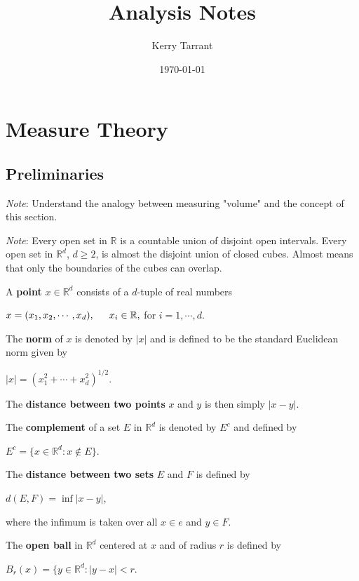 \documentclass{book}
\title{Analysis Notes}
\author{Kerry Tarrant}
\date\today
\newcommand{\RR}{\mathbb R}
\begin{document}
\maketitle
\tableofcontents{}


\chapter{Measure Theory}

\section{Preliminaries}
\textit{Note}: Understand the analogy between measuring "volume" and the concept of this section.

\textit{Note}: Every open set in $\mathbb{R}$ is a countable union of disjoint open intervals. Every open set in $\mathbb{R}^{d}$, $d\geq 2$, is almost the disjoint union of closed cubes. Almost means that only the boundaries of the cubes can overlap.


A \textbf{point} $x\in \RR^{d}$ consists of a $d$-tuple of real numbers
\begin{center}
$x=(x_1,x_2,\cdots,x_d), \hspace*{15pt} x_i\in \RR,$ for $i=1,\cdots,d$.
\end{center}

The \textbf{norm} of $x$ is denoted by $|x|$ and is defined to be the standard Euclidean norm given by
\begin{center}
    $|x|=(x_1^2+\cdots+x_d^2)^{1/2}$.
\end{center}

The \textbf{distance between two points} $x$ and $y$ is then simply $|x-y|$.

The \textbf{complement} of a set $E$ in $\RR^d$ is denoted by $E^c$ and defined by
\begin{center}
    $E^c=\{x\in\RR^d:x\notin E\}$.
\end{center}

The \textbf{distance between two sets} $E$ and $F$ is defined by
\begin{center}
    $d(E,F)=\inf |x-y|$,
\end{center}

where the infimum is taken over all $x\in e$ and $y\in F$.

The \textbf{open ball} in $\RR^d$ centered at $x$ and of radius $r$ is defined by
\begin{center}
    $B_r(x)=\{y\in\RR^d:|y-x|<r$.
\end{center}
\end{document}
